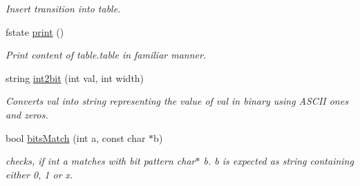 \begin{DoxyCompactItemize}
\begin{DoxyCompactList}\small\item\em Insert transition into table. \end{DoxyCompactList}\item 
fstate \mbox{\hyperlink{classsmtable_a3a80d868ab18cad523c31fa44bbcd691}{print}} ()
\begin{DoxyCompactList}\small\item\em Print content of table.\+table in familiar manner. \end{DoxyCompactList}\item 
string \mbox{\hyperlink{classsmtable_a90160a0a01b714c2b70e5da982e0c9fb}{int2bit}} (int val, int width)
\begin{DoxyCompactList}\small\item\em Converts val into string representing the value of val in binary using A\+S\+C\+II ones and zeros. \end{DoxyCompactList}\item 
bool \mbox{\hyperlink{classsmtable_a9d07557f02b4b69c5f5143fe985e242a}{bits\+Match}} (int a, const char $\ast$b)
\begin{DoxyCompactList}\small\item\em checks, if int a matches with bit pattern char$\ast$ b. b is expected as string containing either \textquotesingle{}0\textquotesingle{}, \textquotesingle{}1\textquotesingle{} or \textquotesingle{}x\textquotesingle{}. \end{DoxyCompactList}\end{DoxyCompactItemize}
